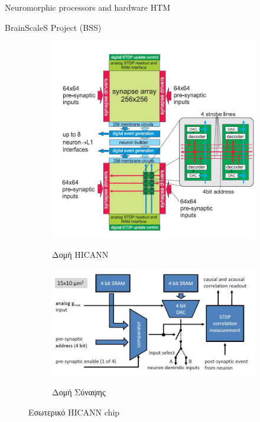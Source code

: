 \documentclass[a4paper,11pt]{article}
\begin{document}
\begin{section}{Neuromorphic processors and hardware HTM}
\begin{subsection}{BrainScaleS Project (BSS)}
\begin{figure} [H]
\begin{subfigure}{0.5\columnwidth}
        {\includegraphics[width=\columnwidth,clip=true]{pics/insideHICANN.jpg}}
        \caption{Δομή HICANN}\label{fig:HICANN}
      \end{subfigure}%
      \begin{subfigure}{0.5\columnwidth}
        \centering
        {\includegraphics[width=0.9\columnwidth,clip=true]{pics/synapses.jpg}}
        \caption{Δομή Σύναψης}\label{fig:Synapses}
      \end{subfigure}
      \caption{Εσωτερικό HICANN chip}
    \end{figure}

\end{subsection}
\end{section}
\end{document}
